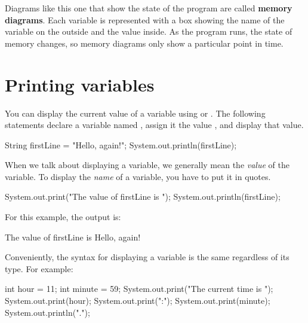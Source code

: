 
Diagrams like this one that show the state of the program are called {\bf memory diagrams}.
Each variable is represented with a box showing the name of the variable on the outside and the value inside.
As the program runs, the state of memory changes, so memory diagrams only show a particular point in time.


\section{Printing variables}
\label{sec:printvar}

You can display the current value of a variable using  or .
The following statements declare a variable named , assign it the value , and display that value.

\begin{code}
String firstLine = "Hello, again!";
System.out.println(firstLine);
\end{code}

%

When we talk about displaying a variable, we generally mean the {\em value} of the variable.
To display the {\em name} of a variable, you have to put it in quotes.

\begin{code}
System.out.print("The value of firstLine is ");
System.out.println(firstLine);
\end{code}

For this example, the output is:

\begin{stdout}
The value of firstLine is Hello, again!
\end{stdout}

Conveniently, the syntax for displaying a variable is the same regardless of its type.
For example:

\begin{code}
int hour = 11;
int minute = 59;
System.out.print("The current time is ");
System.out.print(hour);
System.out.print(":");
System.out.print(minute);
System.out.println(".");
\end{code}

